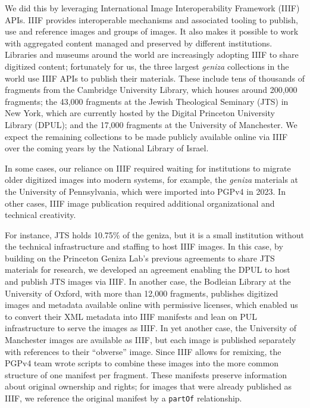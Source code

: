 \documentclass{article}
\begin{document}
We did this by leveraging International Image Interoperability Framework (IIIF) APIs. IIIF provides interoperable mechanisms and associated tooling to publish, use and reference images and groups of images. It also makes it possible to work with aggregated content managed and preserved by different institutions. Libraries and museums around the world are increasingly adopting IIIF to share digitized content; fortunately for us, the three largest \textit{geniza }collections in the world use IIIF APIs to publish their materials. These include tens of thousands of fragments from the Cambridge University Library, which houses around 200,000 fragments; the 43,000 fragments at the Jewish Theological Seminary (JTS) in New York, which are currently hosted by the Digital Princeton University Library (DPUL); and the 17,000 fragments at the University of Manchester. We expect the remaining collections to be made publicly available online via IIIF over the coming years by the National Library of Israel.

In some cases, our reliance on IIIF required waiting for institutions to migrate older digitized images into modern systems, for example, the\textit{ geniza} materials at the University of Pennsylvania, which were imported into PGPv4 in 2023.  In other cases, IIIF image publication required additional organizational and technical creativity. 

For instance, JTS holds 10.75\% of the geniza, but it is a small institution without the technical infrastructure and staffing to host IIIF images. In this case, by building on the Princeton Geniza Lab’s previous agreements to share JTS materials for research, we developed an agreement enabling the DPUL to host and publish JTS images via IIIF. In another case, the Bodleian Library at the University of Oxford, with more than 12,000 fragments, publishes digitized images and metadata available online with permissive licenses, which enabled us to convert their XML metadata into IIIF manifests and lean on PUL infrastructure to serve the images as IIIF. In yet another case, the University of Manchester images are available as IIIF, but each image is published separately with references to their “obverse” image. Since IIIF allows for remixing, the PGPv4 team wrote scripts to combine these images into the more common structure of one manifest per fragment. These manifests preserve information about original ownership and rights; for images that were already published as IIIF, we reference the original manifest by a \texttt{partOf} relationship.
\end{document}
